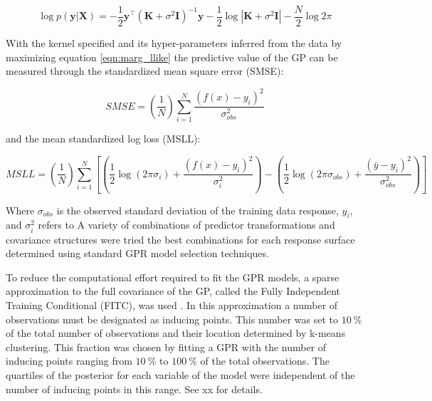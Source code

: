 \begin{equation}\label{eqn:marg_llike}
\log p(\mathbf{y} | \mathbf{X})=-\frac{1}{2} \mathbf{y}^{\top}\left(\mathbf{K}+\sigma^{2} \mathbf{I}\right)^{-1} \mathbf{y}-\frac{1}{2} \log \left|\mathbf{K}+\sigma^{2} \mathbf{I}\right|-\frac{N}{2} \log 2 \pi
\end{equation}

With the kernel specified and its hyper-parameters inferred from the data by maximizing equation \ref{eqn:marg_llike} the predictive value of the GP can be measured through the standardized mean square error (SMSE): 

\begin{equation}\label{eqn:smse}
SMSE =\left(\frac{1}{N}\right) \sum_{i=1}^{N} \frac{\left(f(x)-y_{i}\right)^{2}}{\sigma_{obs}^{2}}
\end{equation}

and the mean standardized log loss (MSLL): 

\begin{equation}\label{msll}
MSLL=\left(\frac{1}{N}\right) \sum_{i=1}^{N}\left[\left(\frac{1}{2} \log \left(2 \pi \sigma_{i}\right)+\frac{\left(f(x)-y_{i}\right)^{2}}{\sigma_{i}^{2}}\right)-\left(\frac{1}{2} \log \left(2 \pi \sigma_{obs}\right)+\frac{\left(\bar{y}-y_{i}\right)^{2}}{\sigma_{obs}^{2}}\right)\right]
\end{equation}  

Where $\sigma_{obs}$ is the observed standard deviation of the training data response, $y_{i}$, and $\sigma_{i}^{2}$ refers to   
A variety of combinations of predictor transformations and covariance structures were tried the best combinations for each response surface determined using standard GPR model selection techniques. 

To reduce the computational effort required to fit the GPR models, a sparse approximation to the full covariance of the GP, called the Fully Independent Training Conditional (FITC), was used \cite{quinonero-candelaUnifyingViewSparse2005}. In this approximation a number of observations must be designated as inducing points. This number was set to $\SI{10}{\percent}$ of the total number of observations and their location determined by k-means clustering. This fraction was chosen by fitting a GPR with the number of inducing points ranging from $\SI{10}{\percent}$ to $\SI{100}{\percent}$ of the total observations. The quartiles of the posterior for each variable of the model were independent of the number of inducing points in this range. See xx for details. 

